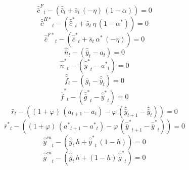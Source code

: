 \begin{dmath}
{{\hat {\bar c}^F}}_{t}-\left({{\hat {\bar c}}}_{t}+{{\bar s}}_{t}\, \left(-{{\eta}}\right)\, \left(1-{{\alpha}}\right)\right)=0
\end{dmath}
\begin{dmath}
{{\hat {\bar c}^{H*}}}_{t}-\left({{\hat {\bar c}^*}}_{t}+{{\bar s}}_{t}\, {{\eta}}\, \left(1-{{\alpha^*}}\right)\right)=0
\end{dmath}
\begin{dmath}
{{\hat {\bar c}^{F*}}}_{t}-\left({{\hat {\bar c}^*}}_{t}+{{\bar s}}_{t}\, {{\alpha^*}}\, \left(-{{\eta}}\right)\right)=0
\end{dmath}
\begin{dmath}
{{\hat {\bar n}}}_{t}-\left({{\hat {\bar y}}}_{t}-{{a}}_{t}\right)=0
\end{dmath}
\begin{dmath}
{{\hat {\bar n}^*}}_{t}-\left({{\hat {\bar y}^*}}_{t}-{{a^*}}_{t}\right)=0
\end{dmath}
\begin{dmath}
{{\hat {\bar f}}}_{t}-\left({{\hat {\bar g}}}_{t}-{{\hat {\bar y}}}_{t}\right)=0
\end{dmath}
\begin{dmath}
{{\hat {\bar f}^*}}_{t}-\left({{\hat {\bar g}^*}}_{t}-{{\hat {\bar y}^*}}_{t}\right)=0
\end{dmath}
\begin{dmath}
{{\bar r}}_{t}-\left(\left(1+{{\varphi}}\right)\, \left({{a}}_{t+1}-{{a}}_{t}\right)-{{\varphi}}\, \left({{\hat {\bar y}}}_{t+1}-{{\hat {\bar y}}}_{t}\right)\right)=0
\end{dmath}
\begin{dmath}
{{\bar r^*}}_{t}-\left(\left(1+{{\varphi}}\right)\, \left({{a^*}}_{t+1}-{{a^*}}_{t}\right)-{{\varphi}}\, \left({{\hat {\bar y}^*}}_{t+1}-{{\hat {\bar y}^*}}_{t}\right)\right)=0
\end{dmath}
\begin{dmath}
{{\hat {\bar y}^{cu}}}_{t}-\left({{\hat {\bar y}}}_{t}\, {{h}}+{{\hat {\bar y}^*}}_{t}\, \left(1-{{h}}\right)\right)=0
\end{dmath}
\begin{dmath}
{{\hat {\bar g}^{cu}}}_{t}-\left({{\hat {\bar g}}}_{t}\, {{h}}+\left(1-{{h}}\right)\, {{\hat {\bar g}^*}}_{t}\right)=0
\end{dmath}
